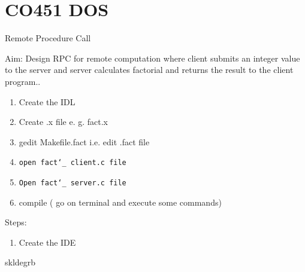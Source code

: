 \documentclass{beamer}
\author[Govt. Colleg of Engg, Jalgaon]{}
\begin{document}
   


\section{CO451 DOS}
\begin{frame}

\begin{center}
	\huge Remote Procedure Call\\
\end{center}

\end{frame} 

\begin{frame}
	Aim: Design RPC for remote computation where client submits an integer value to the server and server calculates factorial and returns the result to the client program..
	\vspace{0.5cm}
	\begin{enumerate}
		\item Create the IDL
		\item Create .x file e. g. fact.x
		\item gedit Makefile.fact  i.e. edit .fact file
		\item \texttt{open fact\char`_ client.c file}
 		\item \texttt{Open fact\char`_ server.c file} 
 		\item compile ( go on terminal and execute some commands)
	\end{enumerate}
	\vspace{2cm}
\end{frame}

\begin{frame}
	Steps:\\
	\begin{enumerate}
	\item Create the IDE\\
		
	\end{enumerate}
	
\end{frame}

\begin{frame}
skldegrb
\end{frame}
\end{document}
